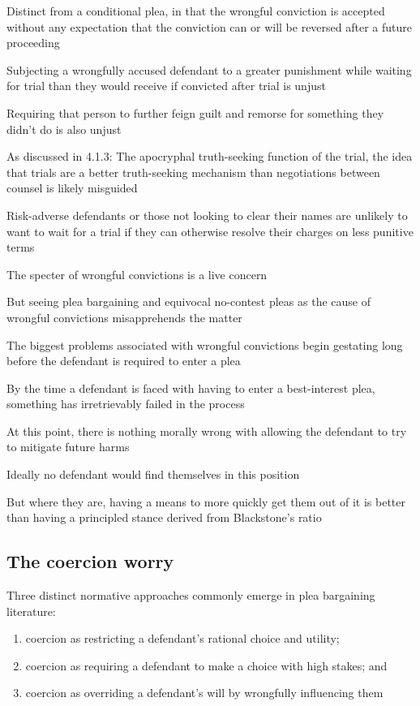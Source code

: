 Distinct from a conditional plea, in that the wrongful conviction is accepted without any expectation that the conviction can or will be reversed after a future proceeding

Subjecting a wrongfully accused defendant to a greater punishment while waiting for trial than they would receive if convicted after trial is unjust

Requiring that person to further feign guilt and remorse for something they didn't do is also unjust

As discussed in 4.1.3: The apocryphal truth-seeking function of the trial, the idea that trials are a better truth-seeking mechanism than negotiations between counsel is likely misguided

Risk-adverse defendants or those not looking to clear their names are unlikely to want to wait for a trial if they can otherwise resolve their charges on less punitive terms

The specter of wrongful convictions is a live concern

But seeing plea bargaining and equivocal no-contest pleas as the cause of wrongful convictions misapprehends the matter

The biggest problems associated with wrongful convictions begin gestating long before the defendant is required to enter a plea

By the time a defendant is faced with having to enter a best-interest plea, something has irretrievably failed in the process

At this point, there is nothing morally wrong with allowing the defendant to try to mitigate future harms

Ideally no defendant would find themselves in this position

But where they are, having a means to more quickly get them out of it is better than having a principled stance derived from Blackstone's ratio

\subsection{The coercion worry}

Three distinct normative approaches commonly emerge in plea bargaining literature:

\begin{enumerate}
    \item coercion as restricting a defendant's rational choice and utility;
    \item coercion as requiring a defendant to make a choice with high stakes; and
    \item coercion as overriding a defendant's will by wrongfully influencing them
\end{enumerate}

